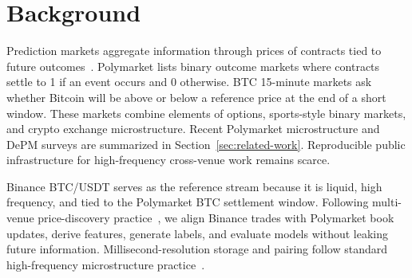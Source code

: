 \section{Background}
\label{sec:background}

Prediction markets aggregate information through prices of contracts tied to
future outcomes~\cite{wolfers2004prediction,hanson2003combinatorial}. Polymarket
lists binary outcome markets where contracts settle to 1 if an event occurs and 0
otherwise. BTC 15-minute markets ask whether Bitcoin will be above or below a
reference price at the end of a short window. These markets combine elements of
options, sports-style binary markets, and crypto exchange microstructure.
Recent Polymarket microstructure and DePM surveys are summarized in
Section~\ref{sec:related-work}. Reproducible public infrastructure for
high-frequency cross-venue work remains scarce.

Binance BTC/USDT serves as the reference stream because it is liquid,
high frequency, and tied to the Polymarket BTC settlement window. Following
multi-venue price-discovery practice~\cite{hasbrouck1995one}, we align Binance
trades with Polymarket book updates, derive features, generate labels, and
evaluate models without leaking future information. Millisecond-resolution
storage and pairing follow standard high-frequency microstructure
practice~\cite{ohara2015high,cont2014price}.
